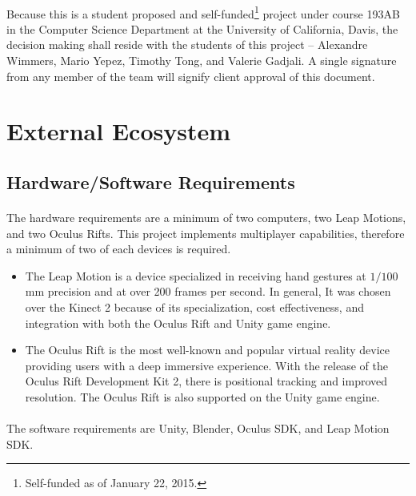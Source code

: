 \paragraph{} Because this is a student proposed and self-funded\footnote{Self-funded as of January 22, 2015.} project under course 193AB in the Computer Science Department at the University of California, Davis, the decision making shall reside with the students of this project -- Alexandre Wimmers, Mario Yepez, Timothy Tong, and Valerie Gadjali. A single signature from any member of the team will signify client approval of this document.

\section{External Ecosystem}

\subsection{Hardware/Software Requirements}

\paragraph{} The hardware requirements are a minimum of two computers, two Leap Motions, and two Oculus Rifts. This project implements multiplayer capabilities, therefore a minimum of two of each devices is required. 

\begin{itemize}
	\item The Leap Motion is a device specialized in receiving hand gestures at \( 1/100 \) mm precision and at over 200 frames per second. In general, It was chosen over the Kinect 2 because of its specialization, cost effectiveness, and integration with both the Oculus Rift and Unity game engine. 
	\item The Oculus Rift is the most well-known and popular virtual reality device providing users with a deep immersive experience. With the release of the Oculus Rift Development Kit 2, there is positional tracking and improved resolution. The Oculus Rift is also supported on the Unity game engine. 
\end{itemize}

\paragraph{} The software requirements are Unity, Blender, Oculus SDK, and Leap Motion SDK.

